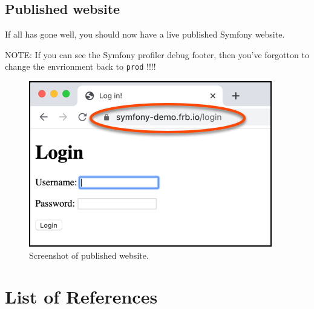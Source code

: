 \documentclass[a4paperpaper,openright]{book}
\begin{document}
\hypertarget{published-website}{%
\section{Published website}\label{published-website}}

If all has gone well, you should now have a live published Symfony
website.

NOTE: If you can see the Symfony profiler debug footer, then you've
forgotton to change the envrionment back to \texttt{prod} !!!!

\begin{figure}
\centering
\includegraphics{./tex2pdf.-5a4428120ede4be1/5239b2fa165edca2271d5022397983741a2d25bb.png}
\caption{Screenshot of published website.}
\end{figure}

\backmatter

\hypertarget{list-of-references}{%
\chapter{List of References}\label{list-of-references}}
\end{document}
